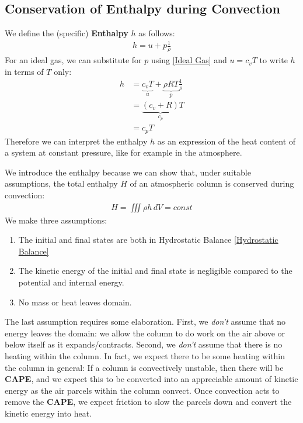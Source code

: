 \subsection{Conservation of Enthalpy during Convection}

We define the (specific) \textbf{Enthalpy} $h$ as follows:
\begin{align}
    h=u+p\frac{1}{\rho}
\end{align}
For an ideal gas, we can substitute for $p$ using \ref{Ideal Gas} and $u=c_vT$ to write $h$ in terms of $T$ only:
\begin{align*}
    h&=\underbrace{c_vT}_{u}+\underbrace{\rho R T}_{p}\frac{1}{\rho}\\
    &=\underbrace{(c_v+R)}_{c_p}T\\
    &=c_pT
\end{align*}
Therefore we can interpret the enthalpy $h$ as an expression of the heat content of a system at constant pressure, like for example in the atmosphere.

We introduce the enthalpy because we can show that, under suitable assumptions, the total enthalpy $H$ of an atmospheric column is conserved during convection:
\begin{align*}
    H=\iiint \rho h\,dV=const
\end{align*}
We make three assumptions:
\begin{enumerate}
    \item The initial and final states are both in Hydrostatic Balance \ref{Hydrostatic Balance}
    \item The kinetic energy of the initial and final state is negligible compared to the potential and internal energy.
    \item No mass or heat leaves domain.
\end{enumerate}
The last assumption requires some elaboration. First, we \textit{don't} assume that no energy leaves the domain: we allow the column to do work on the air above or below itself as it expands/contracts. Second, we \textit{don't} assume that there is no heating within the column. In fact, we expect there to be some heating within the column in general: If a column is convectively unstable, then there will be \textbf{CAPE}, and we expect this to be converted into an appreciable amount of kinetic energy as the air parcels within the column convect. Once convection acts to remove the \textbf{CAPE}, we expect friction to slow the parcels down and convert the kinetic energy into heat. 

